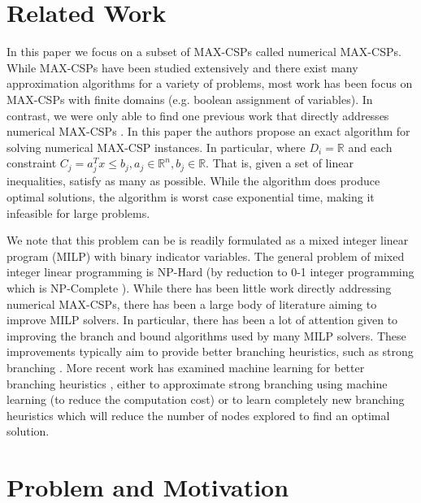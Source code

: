 \documentclass[a4paper]{article}
\begin{document}
\section{Related Work}

In this paper we focus on a subset of MAX-CSPs called numerical MAX-CSPs.  While
MAX-CSPs have been studied extensively and there exist many approximation
algorithms \cite{approx_for_csp_paper} for a variety of problems, most work has
been focus on MAX-CSPs with finite domains (e.g. boolean assignment of
variables).  In contrast, we were only 
able to find one previous work that directly addresses numerical MAX-CSPs
\cite{num_max_csp_paper}.  In this paper the authors propose an exact algorithm
for solving numerical MAX-CSP instances. In particular, where $D_i =
\mathds{R}$ and each constraint $C_j = a_j^Tx \leq b_j, a_j \in \mathds{R}^n,
b_j \in \mathds{R}$.  That is, given a set of linear inequalities, satisfy as
many as possible. While the algorithm does
produce optimal solutions, the algorithm is worst case exponential time, making
it infeasible for large problems. 

We note that this problem can be is readily formulated as a mixed integer
linear program (MILP) with binary indicator variables. The general problem of
mixed integer linear programming is NP-Hard (by reduction to 0-1
integer programming which is NP-Complete \cite{karp_1972}). While there has
been little work directly addressing numerical MAX-CSPs, there has been a
large body of literature aiming to improve MILP solvers. In particular, there
has been a lot of attention given to improving the branch and bound algorithms
used by many MILP solvers. These improvements typically aim to provide better
branching heuristics, such as strong branching
\cite{strong_branching_paper}. More recent work has examined machine learning
for better branching heuristics \cite{bengio_lodi_prouvost_2021}
\cite{liberto_kadioglu_leo_malitsky_2016}, either to approximate strong
branching using machine learning (to reduce the computation cost) or to learn
 completely new branching heuristics which will reduce the number of nodes 
 explored to find an optimal solution.

\section{Problem and Motivation}
\end{document}
